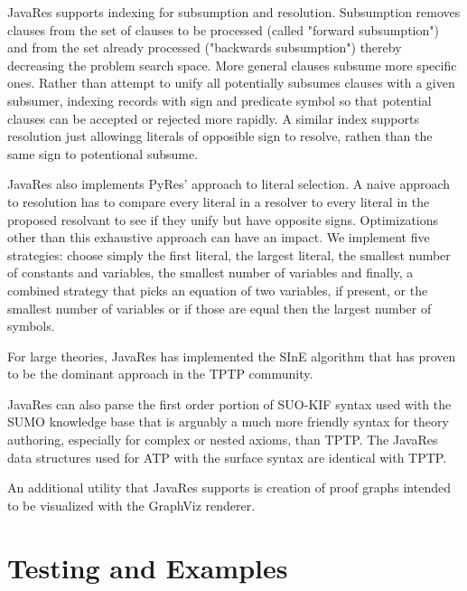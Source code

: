 \documentclass{llncs}
\begin{document}
JavaRes supports indexing for subsumption and resolution.  Subsumption removes clauses from the set of clauses
to be processed (called "forward subsumption") and from the set already processed ("backwards subsumption")
thereby decreasing the problem search space.  More general clauses subsume more specific ones.  Rather than
attempt to unify all potentially subsumes clauses with a given subsumer, indexing records with sign and predicate
symbol so that potential clauses can be accepted or rejected more rapidly.  A similar index supports resolution
just allowingg literals of opposible sign to resolve, rathen than the same sign to potentional subsume.

JavaRes also implements PyRes' approach to literal selection.  A naive approach to resolution has to compare
every literal in a resolver to every literal in the proposed resolvant to see if they unify but have opposite
signs.  Optimizations other than this exhaustive approach can have an impact.  We implement five strategies:
choose simply the first literal, the largest literal, the smallest number of constants and variables,
the smallest number of variables and finally, a combined strategy that picks an equation of two variables,
if present, or the smallest number of variables or if those are equal then the largest number of symbols.

For large theories, JavaRes has implemented the SInE algorithm \cite{HV:CADE-2011}
 that has proven to be the dominant approach in the TPTP community.

JavaRes can also parse the first order portion of SUO-KIF syntax used with the SUMO knowledge base that is
arguably a much more friendly syntax for theory authoring, especially for complex or nested axioms, than TPTP.
The JavaRes data structures used for ATP with the surface syntax are identical with TPTP.

An additional utility that JavaRes supports is creation of proof graphs intended to be visualized
with the GraphViz renderer.

\section{Testing and Examples}
\end{document}
